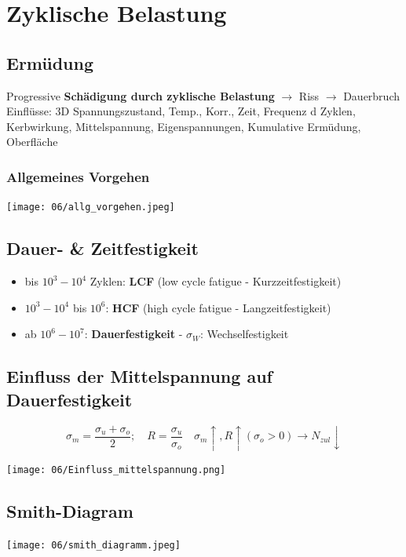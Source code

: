 \section{Zyklische Belastung}
    \subsection{Ermüdung}
        Progressive \textbf{Schädigung durch zyklische Belastung} $\rightarrow$ Riss $\rightarrow$ Dauerbruch\\
        Einflüsse: 3D Spannungszustand, Temp., Korr., Zeit, Frequenz d Zyklen, Kerbwirkung, Mittelspannung, Eigenspannungen, Kumulative Ermüdung, Oberfläche
        \subsubsection{Allgemeines Vorgehen}
            \texttt{[image: 06/allg\_vorgehen.jpeg]}
        \subsection{Dauer- \& Zeitfestigkeit}
            \begin{minipage}{\linewidth}
                \begin{itemize}
                    \item bis $10^3-10^4$ Zyklen: \textbf{LCF} (low cycle fatigue - Kurzzeitfestigkeit)
                    \item $10^3-10^4$ bis $10^6$: \textbf{HCF} (high cycle fatigue - Langzeitfestigkeit)
                    \item ab $10^6-10^7$: \textbf{Dauerfestigkeit} - $\sigma_W$: Wechselfestigkeit
                \end{itemize}
            \end{minipage}
    \subsection{Einfluss der Mittelspannung auf Dauerfestigkeit}
        \vspace{-3mm}
        \[\sigma_m=\frac{\sigma_u+\sigma_o}{2}; \quad R=\frac{\sigma_u}{\sigma_o} \quad \sigma_m \uparrow, R \uparrow (\sigma_o >0) \rightarrow N_{zul} \downarrow\]
        \begin{center}
            \vspace{-2mm}
            \texttt{[image: 06/Einfluss\_mittelspannung.png]}
        \end{center}
    \subsection{Smith-Diagram}
        \texttt{[image: 06/smith\_diagramm.jpeg]}
        \vspace{-2mm}
